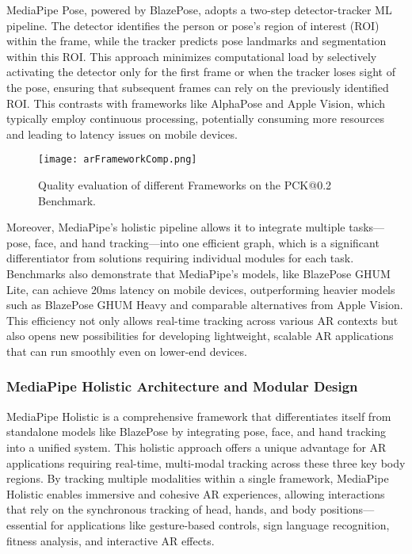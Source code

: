 MediaPipe Pose, powered by BlazePose\cite{bazarevsky2020blazepose}, adopts a two-step detector-tracker ML pipeline. The detector identifies the person or pose’s region of interest (ROI) within the frame, while the tracker predicts pose landmarks and segmentation within this ROI. This approach minimizes computational load by selectively activating the detector only for the first frame or when the tracker loses sight of the pose, ensuring that subsequent frames can rely on the previously identified ROI.
This contrasts with frameworks like AlphaPose and Apple Vision, which typically employ continuous processing, potentially consuming more resources and leading to latency issues on mobile devices.
\begin{figure}[h]
    \centering
    \texttt{[image: arFrameworkComp.png]}
    \caption{Quality evaluation of different Frameworks on the PCK@0.2 Benchmark.}
    \vspace{0.1cm}
    \label{fig:arFrameworks}
\end{figure}
Moreover, MediaPipe’s holistic pipeline allows it to integrate multiple tasks—pose, face, and hand tracking—into one efficient graph, which is a significant differentiator from solutions requiring individual modules for each task.
Benchmarks also demonstrate that MediaPipe’s models, like BlazePose GHUM Lite, can achieve 20ms latency on mobile devices, outperforming heavier models such as BlazePose GHUM Heavy and comparable alternatives from Apple Vision.
This efficiency not only allows real-time tracking across various AR contexts but also opens new possibilities for developing lightweight, scalable AR applications that can run smoothly even on lower-end devices.

\subsubsection{MediaPipe Holistic Architecture and Modular Design}

MediaPipe Holistic is a comprehensive framework that differentiates itself from standalone models like BlazePose by integrating pose, face, and hand tracking into a unified system.
This holistic approach offers a unique advantage for AR applications requiring real-time, multi-modal tracking across these three key body regions.
By tracking multiple modalities within a single framework, MediaPipe Holistic enables immersive and cohesive AR experiences, allowing interactions that rely on the synchronous tracking of head, hands, and body positions—essential for applications like gesture-based controls, sign language recognition, fitness analysis, and interactive AR effects.

